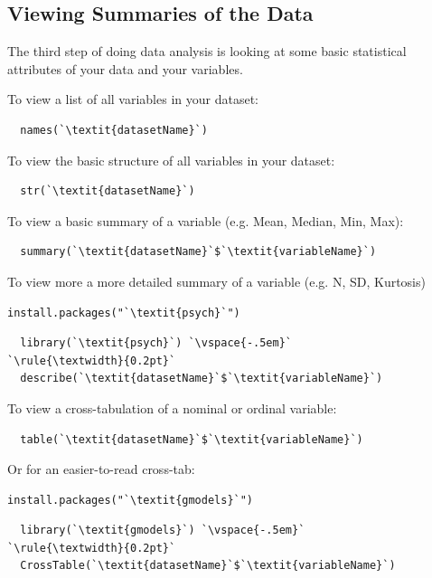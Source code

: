\documentclass[12pt,letterpaper]{article}
\begin{document}
\subsection{Viewing Summaries of the Data}
The third step of doing data analysis is looking at some basic statistical attributes of your data and your variables.
\begin{tcolorbox}[title = Viewing Data Summaries]
To view a list of all variables in your dataset:
\begin{lstlisting}
  names(`\textit{datasetName}`)
\end{lstlisting}
To view the basic structure of all variables in your dataset:
\begin{lstlisting}
  str(`\textit{datasetName}`)
\end{lstlisting}
To view a basic summary of a variable (e.g. Mean, Median, Min, Max):
\begin{lstlisting}
  summary(`\textit{datasetName}`$`\textit{variableName}`)
\end{lstlisting}
To view more a more detailed summary of a variable (e.g. N, SD, Kurtosis)
\begin{lstlisting}[frameround = t t t t, backgroundcolor = \color{lightgray}]
  install.packages("`\textit{psych}`")
\end{lstlisting}
\begin{lstlisting}
  library(`\textit{psych}`) `\vspace{-.5em}`
`\rule{\textwidth}{0.2pt}`
  describe(`\textit{datasetName}`$`\textit{variableName}`)
\end{lstlisting}
To view a cross-tabulation of a nominal or ordinal variable:
\begin{lstlisting}
  table(`\textit{datasetName}`$`\textit{variableName}`)
\end{lstlisting}
\end{tcolorbox}
\begin{tcolorbox}[title = Viewing Data Summaries (cont.)]
Or for an easier-to-read cross-tab:
\begin{lstlisting}[frameround = t t t t, backgroundcolor = \color{lightgray}]
  install.packages("`\textit{gmodels}`")
\end{lstlisting}
\begin{lstlisting}
  library(`\textit{gmodels}`) `\vspace{-.5em}`
`\rule{\textwidth}{0.2pt}`
  CrossTable(`\textit{datasetName}`$`\textit{variableName}`)
\end{lstlisting}
\end{tcolorbox}
\end{document}

